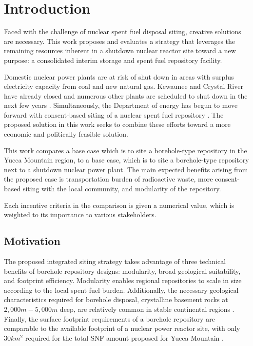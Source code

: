 
\section{Introduction}
Faced with the challenge of nuclear spent fuel disposal siting, creative solutions 
are necessary. This work proposes and evaluates a strategy that leverages the 
remaining resources inherent in a shutdown nuclear reactor site toward a new 
purpose: a consolidated interim storage and spent fuel repository facility.

Domestic nuclear power plants are at risk of shut down in areas with surplus 
electricity capacity from coal and new natural gas. Kewaunee and Crystal River 
have already closed  and numerous other plants are scheduled to shut down in 
the next few years \cite{nei_shutdowns_2016}.  Simultaneously, the Department 
of energy has begun to move forward with consent-based siting of a nuclear 
spent fuel repository \cite{doe_consent_2016}. The proposed solution in this 
work seeks to combine these efforts toward a more economic and politically 
feasible solution. 

This work compares a base case which is to site a borehole-type repository in the
 Yucca Mountain region, to a base case, which is to site a borehole-type repository
 next to a shutdown nuclear power plant. The main expected benefits arising from the
 proposed case is transportation burden of radioactive waste, more consent-based
 siting with the local community, and modularity of the repository. 

Each incentive criteria in the comparison is given a numerical value, which is
weighted to its importance to various stakeholders. 

\subsection{Motivation}
The proposed integrated siting strategy takes advantage of three technical 
benefits of borehole repository designs: modularity, broad geological 
suitability, and footprint efficiency. Modularity enables regional repositories 
to scale in size according to the local spent fuel burden. 
Additionally, the necessary geological characteristics required for borehole 
disposal, crystalline basement rocks at $2,000 m - 5,000 m$ deep, are relatively 
common in stable continental regions \cite{arnold_research_2012}. Finally, the 
surface footprint requirements of a borehole repository are comparable to the 
available footprint of a nuclear power reactor site, with only $30 km^2$ 
required for the total \gls{SNF} amount proposed for Yucca Mountain 
\cite{brady_deep_2009}.

